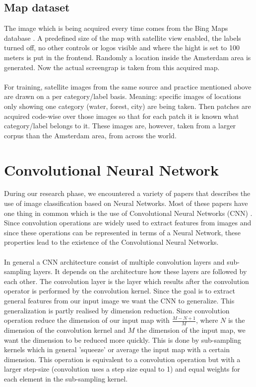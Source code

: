 \documentclass[a4paper,onecolumn]{report}
\begin{document}
\section{Map dataset}
The image which is being acquired every time comes from the Bing Maps database \cite{bing}. A predefined size of the map with satellite view enabled, the labels turned off, no other controls or logos visible and where the hight is set to 100 meters is put in the frontend.  Randomly a location inside the Amsterdam area is generated. Now the actual screengrap is taken from this acquired map.\\
\\
For training, satellite images from the same source and practice mentioned above are drawn on a per category/label basis. Meaning: specific images of locations only showing one category (water, forest, city) are being taken. Then patches are acquired code-wise over those images so that for each patch it is known what category/label belongs to it. These images are, however, taken from a larger corpus than the Amsterdam area, from across the world.

\chapter{Convolutional Neural Network}
\label{chap:CNN}
During our research phase, we encountered a variety of papers that describes the use of image classification based on Neural Networks. Most of these papers have one thing in common which is the use of Convolutional Neural Networks (CNN) \cite{Hongsheng2014} \cite{Farabet2013}. Since convolution operations are widely used to extract features from images and since these operations can be represented in terms of a Neural Network, these properties lead to the existence of the Convolutional Neural Networks.
\\\\
In general a CNN architecture consist of multiple convolution layers and sub-sampling layers. It depends on the architecture how these layers are followed by each other. The convolution layer is the layer which results after the convolution operator is performed by the convolution kernel. Since the goal is to extract general features from our input image we want the CNN to generalize. This generalization is partly realised by dimension reduction. Since convolution operation reduce the dimension of our input map with $\frac{M-N+1}{M}$, where $N$ is the dimension of the convolution kernel and $M$ the dimension of the input map, we want the dimension to be reduced more quickly. This is done by sub-sampling kernels which in general 'squeeze' or average the input map with a certain dimension. This operation is equivalent to a convolution operation but with a larger step-size (convolution uses a step size equal to 1) and equal weights for each element in the sub-sampling kernel.
\end{document}
